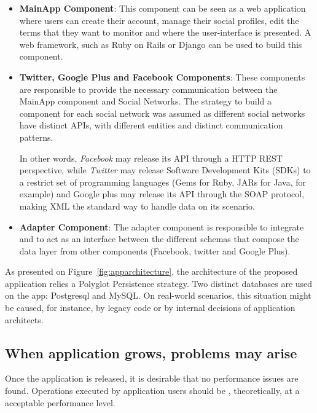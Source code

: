 \begin{itemize}
\item{
\textbf{MainApp Component}: This component can be seen as a web application where users can create their account, manage their social profiles, edit the terms that they want to monitor and where the user-interface is presented. A web framework, such as Ruby on Rails or Django can be used to build this component. 
}

\item{
\textbf{Twitter, Google Plus and Facebook Components}: These components are responsible to provide the necessary communication between the MainApp component and Social Networks. The strategy to build a component for each social network was assumed as different social networks have distinct APIs, with different entities and distinct communication patterns.

In other words, \textit{Facebook} may release its API through a HTTP REST perspective, while \textit{Twitter} may release Software Development Kits (SDKs) to a restrict set of programming languages (Gems for Ruby, JARs for Java, for example) and Google plus may release its API through the SOAP protocol, making XML the standard way to handle data on its scenario.   
}
\item{

\textbf{Adapter Component}: The adapter component is responsible to integrate and to act as an interface between the different schemas that compose the data layer from other components (Facebook, twitter and Google Plus).

}
\end{itemize}

As presented on Figure~\ref{fig:apparchitecture}, the architecture of the proposed application relies a Polyglot Persistence strategy. Two distinct databases are used on the app: Postgresql and MySQL. On real-world scenarios, this situation might be caused, for instance, by legacy code or by internal decisions of application architects.


\subsection{When application grows, problems may arise}
\label{shithappens}

Once the application is released, it is desirable that no performance issues are found. Operations executed by application users should be , theoretically, at a acceptable performance level.

